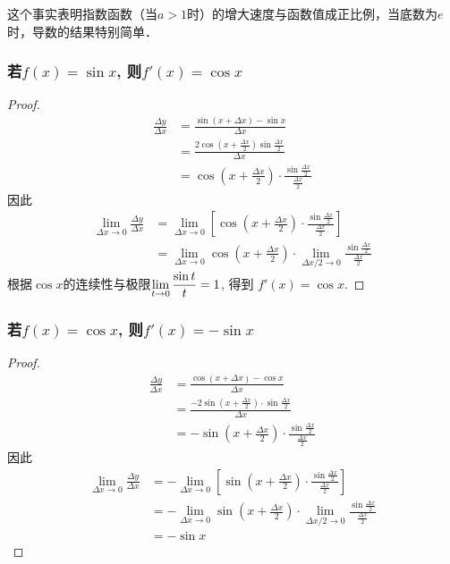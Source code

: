 这个事实表明指数函数（当$a>1$时）的增大速度与函数值成正比例，当底数为$e$时，导数的结果特别简单．


\subsubsection{若$f(x)=\sin x$, 则$f'(x)=\cos x$}
\begin{proof}
    \begin{align*}
\frac{\Delta y}{\Delta x}&=\frac{\sin(x+\Delta x)-\sin x}{\Delta x}\\
&=\frac{2\cos\left(x+\frac{\Delta x}{2}\right)\sin\frac{\Delta x}{2}}{\Delta x}\\
&=\cos\left(x+\frac{\Delta x}{2}\right)\cdot \frac{\sin\frac{\Delta x}{2}}{\frac{\Delta x}{2}}
    \end{align*}
因此
\begin{align*}
    \lim_{\Delta x\to 0}\frac{\Delta y}{\Delta x}&=\lim_{\Delta x\to 0}\left[\cos\left(x+\frac{\Delta x}{2}\right)\cdot \frac{\sin\frac{\Delta x}{2}}{\frac{\Delta x}{2}}\right]\\
    &=\lim_{\Delta x\to 0}\cos\left(x+\frac{\Delta x}{2}\right)\cdot \lim_{\Delta x/2\to 0}\frac{\sin\frac{\Delta x}{2}}{\frac{\Delta x}{2}}
\end{align*}
根据$\cos x$的连续性与极限$\displaystyle\lim_{t\to 0}\dfrac{\sin t}{t}=1$, 得到
$f' (x) =\cos x$.
\end{proof}

\subsubsection{若$f(x)=\cos x$, 则$f'(x)=-\sin x$}
\begin{proof}
\begin{align*}
\frac{\Delta y}{\Delta x}&=\frac{\cos(x+\Delta x)-\cos x}{\Delta x}\\
&=\frac{-2\sin\left(x+\frac{\Delta x}{2}\right)\cdot \sin\frac{\Delta x}{2}}{\Delta x}\\
&=-\sin\left(x+\frac{\Delta x}{2}\right)\cdot \frac{\sin\frac{\Delta x}{2}}{\frac{\Delta x}{2}}
    \end{align*}
因此
\begin{align*}
    \lim_{\Delta x\to 0}\frac{\Delta y}{\Delta x}&=-\lim_{\Delta x\to 0}\left[\sin\left(x+\frac{\Delta x}{2}\right)\cdot \frac{\sin\frac{\Delta x}{2}}{\frac{\Delta x}{2}}\right]\\
    &=-\lim_{\Delta x\to 0}\sin\left(x+\frac{\Delta x}{2}\right)\cdot \lim_{\Delta x/2\to 0}\frac{\sin\frac{\Delta x}{2}}{\frac{\Delta x}{2}}\\
    &=-\sin  x
\end{align*}
\end{proof}

